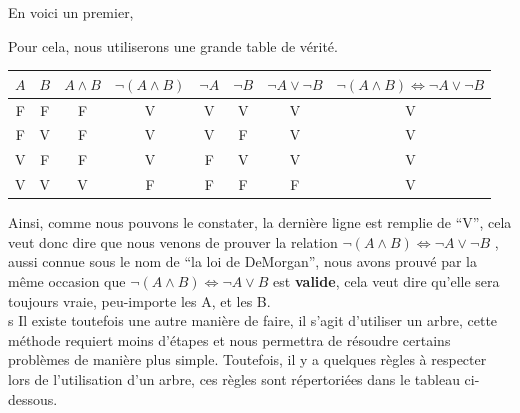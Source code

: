 \documentclass[a4paper, 12pt]{article}
\newcommand{\ffi}{\Leftrightarrow}
\numberwithin{equation}{subsection}
\begin{document}
  En voici un premier,
  \begin{center}
    \Ovalbox{$ \neg (A \land B ) \ffi \neg A \lor \neg B$}
  \end{center}
  Pour cela, nous utiliserons une grande table de vérité.
  \begin{table}[H]
    \centering
    \begin{tabular}{|c|c|c|c|c|c|c|c|}
      \hline $A$ & $B$ & $A \land B$ & $\neg (A \land B)$ & $\neg A$ & $\neg B$ & $\neg A \lor \neg B$ & $\neg (A \land B) \ffi \neg A \lor \neg B$ \\
      \hline  F  &  F  &      F      &          V         &     V    &     V    &          V           &                     V                      \\
              F  &  V  &      F      &          V         &     V    &     F    &          V           &                     V                      \\
              V  &  F  &      F      &          V         &     F    &     V    &          V           &                     V                      \\
              V  &  V  &      V      &          F         &     F    &     F    &          F           &                     V                      \\
      \hline
    \end{tabular}
  \end{table}
  Ainsi, comme nous pouvons le constater, la dernière ligne est remplie de ``V'', cela veut donc dire que nous venons de prouver la relation $\neg (A \land B) \ffi \neg A \lor \neg B$ , aussi connue sous le nom de ``la loi de DeMorgan'', nous avons prouvé par la même occasion que $\neg (A \land B) \ffi \neg A \lor B$ est {\bf valide}, cela veut dire qu'elle sera toujours vraie, peu-importe les A, et les B.\\s
  Il existe toutefois une autre manière de faire, il s'agit d'utiliser un arbre, cette méthode requiert moins d'étapes et nous permettra de résoudre certains problèmes de manière plus simple. Toutefois, il y a quelques règles à respecter lors de l'utilisation d'un arbre, ces  règles sont répertoriées dans le tableau ci-dessous. \\
\end{document}
